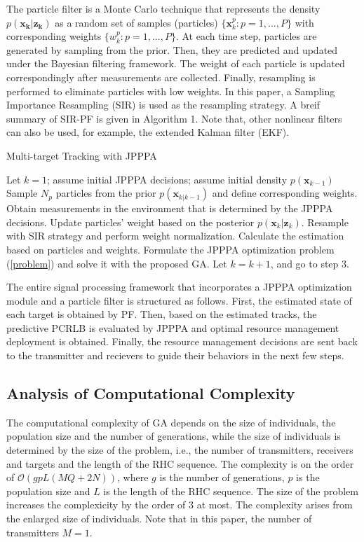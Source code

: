 \documentclass[12pt,journal,draftclsnofoot,onecolumn]{IEEEtran}
\begin{document}
The particle filter is a Monte Carlo technique that represents the density $p(\mathbf{x_k|z_k})$ as a random set of samples (particles) $\lbrace \mathbf{x}_k^p:p=1,...,P \rbrace$ with corresponding weights  $\lbrace w_k^p:p=1,...,P\rbrace$. At each time step, particles are generated by sampling from the prior. Then, they are predicted and updated under the Bayesian filtering framework. The weight of each particle is updated correspondingly after measurements are collected. Finally, resampling is performed to eliminate particles with low weights. In this paper, a Sampling Importance Resampling (SIR) is used as the resampling strategy. A breif summary of SIR-PF is given in Algorithm 1. Note that, other nonlinear filters can also be used, for example, the extended Kalman filter (EKF)\cite{bar2004estimation}. 



\begin{algorithm}
\caption{Multi-target Tracking with JPPPA} 
\label{alg:Framwork} 
\begin{algorithmic}[1]
\STATE Let $k=1$; assume initial JPPPA decisions; assume initial density $p(\mathbf{x}_{k-1})$
\STATE Sample $N_p$ particles from the prior $p(\mathbf{x}_{k|k-1})$ and define corresponding weights.
\STATE Obtain measurements in the environment that is determined by the JPPPA decisions.
\STATE Update particles' weight based on the posterior $p(\mathbf{x}_k|\mathbf{z}_k)$.
\STATE Resample with SIR strategy and perform weight normalization.
\STATE Calculate the estimation based on particles and weights.
\ENDFOR
\STATE Formulate the JPPPA optimization problem (\ref{problem}) and solve it with the proposed GA.
\STATE Let $k=k+1$, and go to step 3.
\end{algorithmic}
\end{algorithm}

The entire signal processing framework that incorporates a JPPPA optimization module and a particle filter is structured as follows. First, the estimated state of each target is obtained by PF. Then, based on the estimated tracks, the predictive PCRLB is evaluated by JPPPA and optimal resource management deployment is obtained. Finally, the resource management decisions are sent back to the transmitter and recievers to guide their behaviors in the next few steps.

\subsection{Analysis of Computational Complexity}
The computational complexity of GA depends on the size of individuals, the population size and the number of generations, while the size of individuals is determined by the size of the problem, i.e., the number of transmitters, receivers and targets and the length of the RHC sequence. The complexity is on the order of $\mathcal{O}(gpL(MQ+2N))$, where $g$ is the number of generations, $p$ is the population size and $L$ is the length of the RHC sequence. The size of the problem increases the complexicity by the order of 3 at most. The complexity arises from the enlarged size of individuals. Note that in this paper, the number of transmitters $M=1$. 
\end{document}
